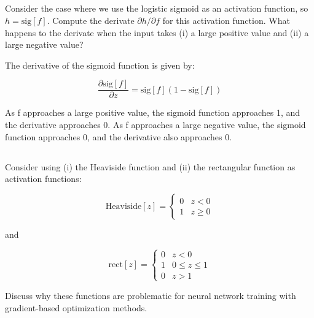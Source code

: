 \documentclass[12pt]{report}
\begin{document}
\subsection{}
\begin{mdframed}
    Consider the case where we use the logistic sigmoid as an activation function, so $h = \text{sig}[f]$. Compute the derivate $\partial h / \partial f$ for this activation function. What happens to the derivate when the input takes (i) a large positive value and (ii) a large negative value?
\end{mdframed}

The derivative of the sigmoid function is given by:

\begin{equation*}
    \frac{\partial \text{sig}[f]}{\partial z} = \text{sig}[f](1 - \text{sig}[f])
\end{equation*}

As f approaches a large positive value, the sigmoid function approaches 1, and the derivative approaches 0. As f approaches a large negative value, the sigmoid function approaches 0, and the derivative also approaches 0.

\subsection{}
\begin{mdframed}
    Consider using (i) the Heaviside function and (ii) the rectangular function as activation functions:

    \begin{equation*}
        \text{Heaviside}[z] = \begin{cases}
            0 & z < 0    \\
            1 & z \geq 0
        \end{cases}
    \end{equation*}

    and

    \begin{equation*}
        \text{rect}[z] = \begin{cases}
            0 & z < 0           \\
            1 & 0 \leq z \leq 1 \\
            0 & z > 1
        \end{cases}
    \end{equation*}

    Discuss why these functions are problematic for neural network training with gradient-based optimization methods.
\end{mdframed}
\end{document}
